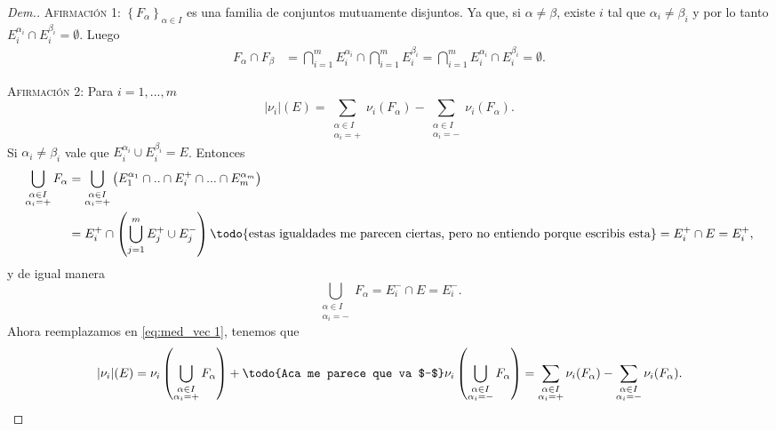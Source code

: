 \begin{proof}[Dem.]
\textsc{Afirmación 1:}  $\left\lbrace F_\alpha\right\rbrace _{\alpha\in I}$ es una familia de conjuntos mutuamente disjuntos.
Ya que, si  $\alpha\neq\beta$, existe $i$ tal que  $\alpha_i\neq\beta_i$  y por lo tanto $E_i^{\alpha_i}\cap E_i^{\beta_i}=\emptyset$. Luego
  \begin{equation*}
  	\begin{split}
  		F_\alpha\cap F_\beta&=\bigcap_{i=1}^mE_i^{\alpha_i}\cap \bigcap_{i=1}^mE_i^{\beta_i}=\bigcap_{i=1}^mE_i^{\alpha_i}\cap E_i^{\beta_i}=\emptyset.
  	\end{split}
  \end{equation*}
  

\textsc{Afirmación 2:} 
Para $i=1,...,m$ 
  \begin{equation}\label{eq:med-vec 2}
  	|\nu_i|(E)= \sum_{\substack{\alpha\in I\\ \alpha_i=+}}\nu_i(F_\alpha)-\sum_{\substack{\alpha\in I\\ \alpha_i=-}}\nu_i(F_\alpha).
  \end{equation}
  Si $\alpha_i\neq \beta_i$  vale que $E_i^{\alpha_i}\cup E_i^{\beta_i}=E$. Entonces
  \begin{equation*}
      \begin{split}
        \bigcup_{\substack{\alpha\in I\\ \alpha_i=+}}F_\alpha&=\bigcup_{\substack{\alpha\in I\\ \alpha_i=+}}\left( E_1^{\alpha_1}\cap..\cap  E_i^+\cap...\cap E_m^{\alpha_m} \right)\\
        &=E_i^+\cap \left(\bigcup_{j=1}^m E_j^+\cup E_j^- \right)\textrm{\todo{estas igualdades me parecen ciertas, pero no entiendo porque escribis esta}}=E_i^+\cap E=E_i^+,
      \end{split}
  \end{equation*}
  y de igual manera 
  \begin{equation*}
        \bigcup_{\substack{\alpha\in I\\ \alpha_i=-}}F_\alpha=
        E_i^-\cap E=E_i^-.
  \end{equation*}
Ahora reemplazamos en \eqref{eq:med_vec 1}, tenemos que 
\begin{equation*}
  	|\nu_i|(E)=\nu_i \left( \bigcup_{\substack{\alpha\in I\\ \alpha_i=+}}F_\alpha\right) +\textrm{\todo{Aca me parece que va $-$}} \nu_i \left( \bigcup_{\substack{\alpha\in I\\ \alpha_i=-}}F_\alpha\right)= \sum_{\substack{\alpha\in I\\ \alpha_i=+}}\nu_i(F_\alpha)-\sum_{\substack{\alpha\in I\\ \alpha_i=-}}\nu_i(F_\alpha).
  \end{equation*}
  

\end{proof}
